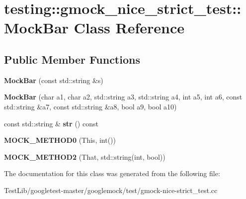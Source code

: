 \hypertarget{classtesting_1_1gmock__nice__strict__test_1_1MockBar}{}\section{testing\+:\+:gmock\+\_\+nice\+\_\+strict\+\_\+test\+:\+:Mock\+Bar Class Reference}
\label{classtesting_1_1gmock__nice__strict__test_1_1MockBar}
\subsection*{Public Member Functions}
\begin{DoxyCompactItemize}
\item 
\mbox{\label{classtesting_1_1gmock__nice__strict__test_1_1MockBar_abd4e7936dc389201ce608257f7a02584}} 
{\bfseries Mock\+Bar} (const std\+::string \&s)
\item 
\mbox{\label{classtesting_1_1gmock__nice__strict__test_1_1MockBar_ad6b73066fdcdd71ac1add73ef56b53ef}} 
{\bfseries Mock\+Bar} (char a1, char a2, std\+::string a3, std\+::string a4, int a5, int a6, const std\+::string \&a7, const std\+::string \&a8, bool a9, bool a10)
\item 
\mbox{\label{classtesting_1_1gmock__nice__strict__test_1_1MockBar_adc0fb56c042e95e1a459bb007e813169}} 
const std\+::string \& {\bfseries str} () const
\item 
\mbox{\label{classtesting_1_1gmock__nice__strict__test_1_1MockBar_a9aad688c2b1dc6b529b7c499e49e3a70}} 
{\bfseries M\+O\+C\+K\+\_\+\+M\+E\+T\+H\+O\+D0} (This, int())
\item 
\mbox{\label{classtesting_1_1gmock__nice__strict__test_1_1MockBar_afa41d45dd7066f014f755f152ec16a73}} 
{\bfseries M\+O\+C\+K\+\_\+\+M\+E\+T\+H\+O\+D2} (That, std\+::string(int, bool))
\end{DoxyCompactItemize}


The documentation for this class was generated from the following file\+:\begin{DoxyCompactItemize}
\item 
Test\+Lib/googletest-\/master/googlemock/test/gmock-\/nice-\/strict\+\_\+test.\+cc\end{DoxyCompactItemize}
